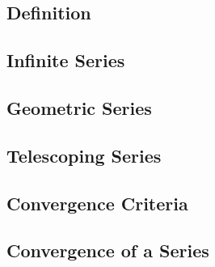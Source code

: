 \documentclass[a4paper,12pt]{article}
\begin{document}
\subsection{Definition}
\label{sec:orgb01972d}
\subsection{Infinite Series}
\label{sec:org72ba9fe}
\subsection{Geometric Series}
\label{sec:org68a3bc3}
\subsection{Telescoping Series}
\label{sec:orgf498b86}
\subsection{Convergence Criteria}
\label{sec:org356c24a}
\subsection{Convergence of a Series}
\label{sec:org30eda1d}
\end{document}
